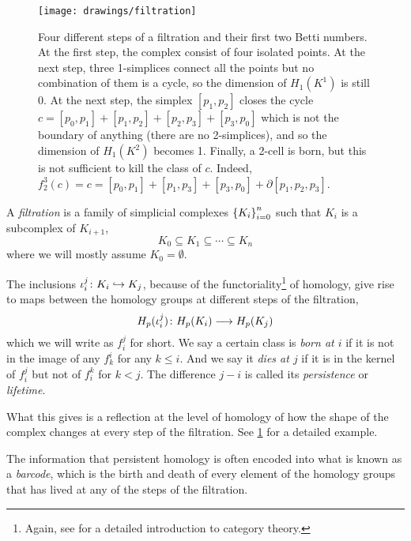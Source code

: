 \documentclass[../main.tex]{subfiles}
\begin{document}
\begin{figure}[htb]
	\centering
	\texttt{[image: drawings/filtration]}
	\caption{Four different steps of a filtration and their first two Betti numbers. At the
		first step, the complex consist of four isolated points. At the next step, three
		1-simplices connect all the points but no combination of them is a cycle, so the dimension
		of \( H_1(K^1) \) is still 0. At the next step, the simplex \( [p_1,p_2] \) closes the
		cycle \( c = [p_0,p_1] + [p_1,p_2] + [p_2,p_3] + [p_3,p_0] \)	which is not the boundary of
		anything (there are no 2-simplices), and so the dimension of \( H_1(K^2) \) becomes 1.
		Finally, a 2-cell is born, but this is not sufficient to kill the class of \( c \).
	Indeed, \( f_2^3(c) = c = [p_0,p_1] + [p_1,p_3] + [p_3,p_0] + \partial[p_1,p_2,p_3] \).}
	\label{fig:filtration}
\end{figure}

\begin{definition}[Filtration]
	A \emph{filtration} is a family of simplicial complexes \( \left\{ K_i \right\}_{i = 0}^n \)	such
	that \( K_i \) is a subcomplex of \( K_{i+1} \),
	\begin{equation*}
		K_0 \subseteq K_1 \subseteq \cdots \subseteq K_n
	\end{equation*}
	where we will mostly assume \( K_0 = \emptyset \). 
\end{definition}
The inclusions \( \iota_i^j \colon K_i \hookrightarrow K_j \), because of the
functoriality\footnote{Again, see \cite{riehl} for a detailed introduction to category
theory.} of homology, give rise to maps between the homology groups at different steps of
the filtration,
\begin{equation*}
	H_p(\iota_i^j) \colon H_p(K_i) \longrightarrow H_p(K_j)
\end{equation*}
which we will write as \( f_i^j \) for short. We say a certain class is \emph{born at \( i
\)} if it is not in the image of any \( f_k^i \) for any \( k \leq i \). And we say it
\emph{dies at \( j \)} if it is in the kernel of \( f_i^j \) but not of \( f_i^k \) for \(
k < j \). The difference \( j - i \) is called its \emph{persistence} or \emph{lifetime}. 

What this gives is a reflection at the level of homology of how the shape of the complex
changes at every step of the filtration. See \cref{fig:filtration} for a detailed example.

The information that persistent homology is often encoded into what is known as a
\emph{barcode}, which is the birth and death of every element of the homology groups that
has lived at any of the steps of the filtration. 
\end{document}
